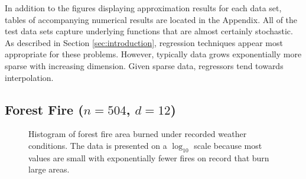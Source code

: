 \documentclass[smallextended,final]{svjour3}       %
\begin{document}
In addition to the figures displaying approximation results for each data
set, tables of accompanying numerical results are located in the Appendix.
All of the test data sets capture underlying functions that are almost
certainly stochastic. As described in Section \ref{sec:introduction},
regression techniques appear most appropriate for these problems. However,
typically data grows exponentially more sparse with increasing
dimension. Given sparse data, regressors tend towards interpolation.

\subsection{Forest Fire ($n = 504$, $d = 12$)}

\begin{figure}
  \centering
  \caption{Histogram of forest fire area burned under recorded weather
conditions. The data is presented on a $\log_{10}$ scale because most values
are small with exponentially fewer fires on record that burn large areas.}
  \label{fig:hist-forest-fire}
\end{figure}
\end{document}

